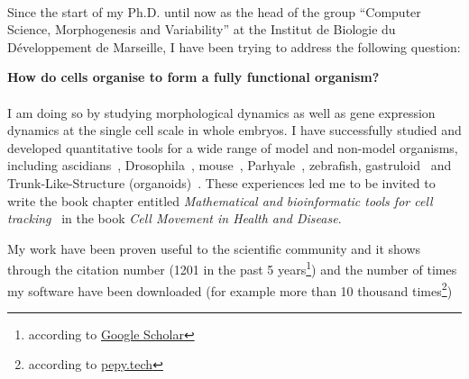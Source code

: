 \paragraph{}Since the start of my Ph.D. until now as the head of the group ``Computer Science, Morphogenesis and Variability'' at the Institut de Biologie du D\'eveloppement de Marseille, I have been trying to address the following question:
\begin{center}
   \textbf{How do cells organise to form a fully functional organism?}
\end{center}
\paragraph{}I am doing so by studying morphological dynamics as well as gene expression dynamics at the single cell scale in whole embryos.
I have successfully studied and developed quantitative tools for a wide range of model and non-model organisms, including ascidians~\cite{Guignard2020}, Drosophila~\cite{Malin-Mayor:2022aa}, mouse~\cite{McDole:2018aa,Sampath-Kuma:2022aa}, Parhyale~\cite{Wolff:2018aa}, zebrafish, gastruloid~\cite{Gros2025} and Trunk-Like-Structure (organoids)~\cite{Veenvliet:2020aa}.
These experiences led me to be invited to write the book chapter entitled \textit{Mathematical and bioinformatic tools for cell tracking}~\cite{Hirsch2022} in the book \textit{Cell Movement in Health and Disease}.


My work have been proven useful to the scientific community and it shows through the citation number (1201 in the past 5 years\footnote{according to \href{https://scholar.google.fr/citations?user=PCSQdWIAAAAJ&hl=en}{Google Scholar}}) and the number of times my software have been downloaded (for example more than 10 thousand times\footnote{according to \href{https://pepy.tech/projects/napari-sc3d-viewer}{pepy.tech}})
